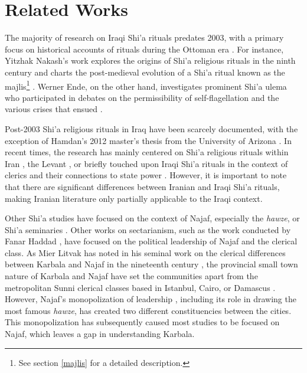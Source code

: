 \section{Related Works}
The majority of research on Iraqi Shi'a rituals predates 2003, with a primary focus on historical accounts of rituals during the Ottoman era \cite{nakash_shiis_1994} \cite{brunner_twelver_2001} \cite{ayoub_redemptive_1978}. For instance, Yitzhak Nakash's work explores the origins of Shi'a religious rituals in the ninth century and charts the post-medieval evolution of a Shi'a ritual known as the majlis\footnote{See section \ref{majlis} for a detailed description.} \cite[164]{yitzhak_nakash_attempt_1993}. Werner Ende, on the other hand, investigates prominent Shi'a ulema who participated in debates on the permissibility of self-flagellation and the various crises that ensued \cite{ende_flagellations_1978}. 

Post-2003 Shi'a religious rituals in Iraq have been scarcely documented, with the exception of Hamdan's 2012 master's thesis from the University of Arizona \cite{hamdan_development_2012}. In recent times, the research has mainly centered on Shi'a religious rituals within Iran \cite{dabashi_taziyeh_2005} \cite{aghaie_martyrs_2004} \cite{flaskerud_visualizing_2012} \cite{saramifar_circling_2020}, the Levant \cite{weiss_shadow_2010} \cite{szanto_beyond_2013}, or briefly touched upon Iraqi Shi'a rituals in the context of clerics and their connections to state power \cite{nakash_reaching_2006} \cite{davis_memories_2005} \cite{cole_ayatollahs_2006}. However, it is important to note that there are significant differences between Iranian and Iraqi Shi'a rituals, making Iranian literature only partially applicable to the Iraqi context.

Other Shi'a studies have focused on the context of Najaf, especially the \emph{hawze}, or Shi'a seminaries \cite{kassem_modernization_2018} \cite{mottahedeh_najaf_2016}. Other works on sectarianism, such as the work conducted by Fanar Haddad \cite{haddad_understanding_2020}, have focused on the political leadership of Najaf and the clerical class. As Mier Litvak has noted in his seminal work on the clerical differences between Karbala and Najaf in the nineteenth century \cite{litvak_shii_2002}, the provincial small town nature of Karbala and Najaf have set the communities apart from the metropolitan Sunni clerical classes based in Istanbul, Cairo, or Damascus \cite[3]{litvak_shii_2002}. However, Najaf's monopolization of leadership \cite[64]{litvak_shii_2002}, including its role in drawing the most famous \emph{hawze}, has created two different constituencies between the cities. This monopolization has subsequently caused most studies to be focused on Najaf, which leaves a gap in understanding Karbala.

